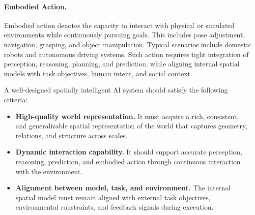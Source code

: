 \paragraph{Embodied Action.}
Embodied action denotes the capacity to interact with physical or simulated environments while continuously pursuing goals.
This includes pose adjustment, navigation, grasping, and object manipulation.
Typical scenarios include domestic robots and autonomous driving systems.
Such action requires tight integration of perception, reasoning, planning, and prediction, while aligning internal spatial models with task objectives, human intent, and social context.








\vspace{4mm}
\begin{tcolorbox}[
    colback=gray!5,
    colframe=black,
    title=\textbf{What Constitutes a Strong Spatially Intelligent System}
]
A well-designed spatially intelligent AI system should satisfy the following criteria:
\begin{itemize}[leftmargin=2em,itemsep=0.35em]
    \item \textbf{High-quality world representation.}  
    It must acquire a rich, consistent, and generalizable spatial representation of the world that captures geometry, relations, and structure across scales.
    
    \item \textbf{Dynamic interaction capability.}  
    It should support accurate perception, reasoning, prediction, and embodied action through continuous interaction with the environment.
    
    \item \textbf{Alignment between model, task, and environment.}  
    The internal spatial model must remain aligned with external task objectives, environmental constraints, and feedback signals during execution.
\end{itemize}
\end{tcolorbox}








